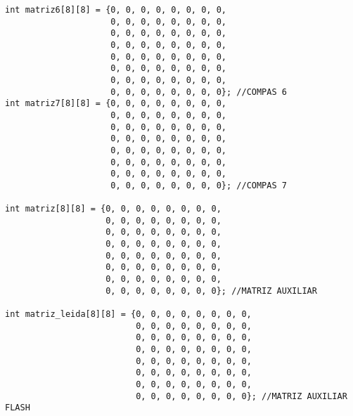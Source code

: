 \documentclass[12pt,a4paper]{article}
\begin{document}
\begin{lstlisting}[basicstyle=\footnotesize]
int matriz6[8][8] = {0, 0, 0, 0, 0, 0, 0, 0,
                     0, 0, 0, 0, 0, 0, 0, 0,
                     0, 0, 0, 0, 0, 0, 0, 0,
                     0, 0, 0, 0, 0, 0, 0, 0,
                     0, 0, 0, 0, 0, 0, 0, 0,
                     0, 0, 0, 0, 0, 0, 0, 0,
                     0, 0, 0, 0, 0, 0, 0, 0,
                     0, 0, 0, 0, 0, 0, 0, 0}; //COMPAS 6
int matriz7[8][8] = {0, 0, 0, 0, 0, 0, 0, 0,
                     0, 0, 0, 0, 0, 0, 0, 0,
                     0, 0, 0, 0, 0, 0, 0, 0,
                     0, 0, 0, 0, 0, 0, 0, 0,
                     0, 0, 0, 0, 0, 0, 0, 0,
                     0, 0, 0, 0, 0, 0, 0, 0,
                     0, 0, 0, 0, 0, 0, 0, 0,
                     0, 0, 0, 0, 0, 0, 0, 0}; //COMPAS 7

int matriz[8][8] = {0, 0, 0, 0, 0, 0, 0, 0,
                    0, 0, 0, 0, 0, 0, 0, 0,
                    0, 0, 0, 0, 0, 0, 0, 0,
                    0, 0, 0, 0, 0, 0, 0, 0,
                    0, 0, 0, 0, 0, 0, 0, 0,
                    0, 0, 0, 0, 0, 0, 0, 0,
                    0, 0, 0, 0, 0, 0, 0, 0,
                    0, 0, 0, 0, 0, 0, 0, 0}; //MATRIZ AUXILIAR

int matriz_leida[8][8] = {0, 0, 0, 0, 0, 0, 0, 0,
                          0, 0, 0, 0, 0, 0, 0, 0,
                          0, 0, 0, 0, 0, 0, 0, 0,
                          0, 0, 0, 0, 0, 0, 0, 0,
                          0, 0, 0, 0, 0, 0, 0, 0,
                          0, 0, 0, 0, 0, 0, 0, 0,
                          0, 0, 0, 0, 0, 0, 0, 0,
                          0, 0, 0, 0, 0, 0, 0, 0}; //MATRIZ AUXILIAR FLASH
\end{lstlisting}
\end{document}

